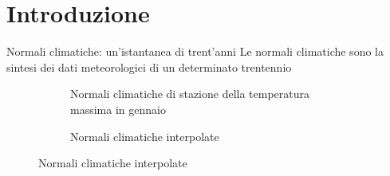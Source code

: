 
\section{Introduzione}
\begin{frame}{Normali climatiche: un'istantanea di trent'anni}
  Le normali climatiche sono la sintesi dei dati meteorologici di un determinato trentennio
  \begin{figure}
    \centering
    \begin{subtable}[m]{0.3\textwidth}
      \centering
      \small
      
      \caption{Esempio di dato grezzo}
    \end{subtable}
    \hfill
    \begin{subfigure}[m]{0.3\textwidth}
      \centering
      
      \caption{Normali climatiche di stazione della temperatura massima in gennaio}
    \end{subfigure}
    \hfill
    \begin{subfigure}[m]{0.3\textwidth}
      \caption{Normali climatiche interpolate}
    \end{subfigure}
  \end{figure}
\end{frame}

